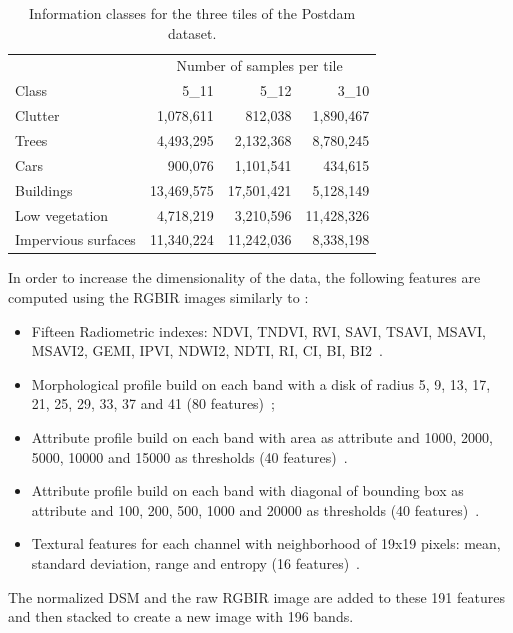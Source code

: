 \documentclass[journal]{IEEEtran}
\begin{document}
    \begin{table}[!t]
        \centering
        \caption{Information classes for the three tiles of the Postdam dataset.\label{tab:potsdam}}
        \begin{tabular}[b]{lrrr}\toprule
          & \multicolumn{3}{c}{Number of samples per tile}\\
            \cmidrule{2-4}
            Class &   5\_11  &   5\_12  & 3\_10 \\
          \midrule
          Clutter             & 1,078,611  & 812,038    & 1,890,467 \\
          Trees               & 4,493,295  & 2,132,368  & 8,780,245 \\
          Cars                & 900,076    & 1,101,541  & 434,615 \\
          Buildings           & 13,469,575 & 17,501,421 & 5,128,149 \\
          Low vegetation      & 4,718,219  & 3,210,596  & 11,428,326 \\
          Impervious surfaces & 11,340,224 & 11,242,036 & 8,338,198 \\
          \bottomrule
        \end{tabular}
    \end{table}

    In order to increase the dimensionality of the data, the following features are computed using the RGBIR images similarly to \cite{tuia2015multiclass}:
    \begin{itemize}
        \item Fifteen Radiometric indexes: NDVI, TNDVI, RVI, SAVI, TSAVI, MSAVI, MSAVI2, GEMI, IPVI, NDWI2, NDTI, RI, CI, BI, BI2~\cite{otb}.
        \item Morphological profile build on each band with a disk of radius 5, 9, 13, 17, 21, 25, 29, 33, 37 and 41 (80 features)~\cite{fauvel2013advances};
        \item Attribute profile build on each band with area as attribute and 1000, 2000, 5000, 10000 and 15000 as thresholds (40 features)~\cite{dalla2010morphological}.
        \item Attribute profile build on each band with diagonal of bounding box as attribute and 100, 200, 500, 1000 and 20000 as thresholds (40 features)~\cite{dalla2010morphological}.
        \item Textural features for  each channel with neighborhood of
          19x19 pixels:  mean, standard  deviation, range  and entropy
          (16 features)~\cite{otb}.
    \end{itemize}
    The normalized DSM and the raw  RGBIR image are added to these 191
    features and  then stacked to  create a  new image  with 196
    bands. %
\end{document}
